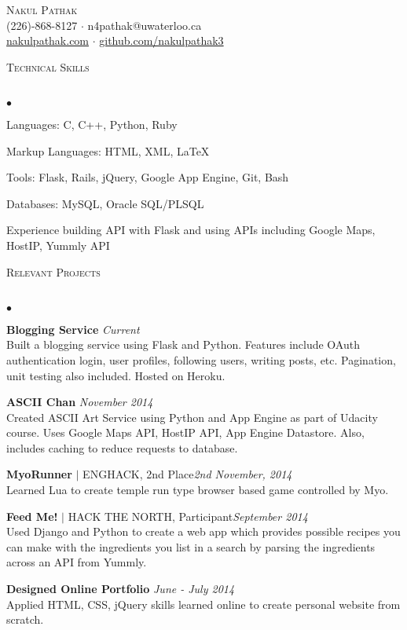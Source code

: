\documentclass{article}
\newcommand{\lineunder}{\vspace*{-8pt} \\ \hspace*{-18pt} \hrulefill \\}
\newcommand{\header}[1]{{\hspace*{-15pt}\vspace*{6pt} \textsc{#1}} \vspace*{-6pt} \lineunder}
\newenvironment{achievements}{\begin{list}{$\bullet$}{\topsep 0pt \itemsep -1.5pt \leftmargin 5pt}}{\vspace*{4pt}\end{list}}
\begin{document}
\small
\smallskip
\vspace*{-45pt}

\begin{center}
	{\huge \scshape {Nakul Pathak}} \\
\vspace*{6pt} 
(226)-868-8127 $\cdot$ n4pathak@uwaterloo.ca \\
\vspace{1.5pt}
  \url{nakulpathak.com}  $\cdot$ \url{github.com/nakulpathak3}
\end{center}


\vspace{-10pt}
\header{\normalsize Technical Skills}
\begin{achievements}
\item Languages: C, C++, Python, Ruby
\item Markup Languages: HTML, XML, LaTeX
\item Tools: Flask, Rails, jQuery, Google App Engine, Git, Bash
\item Databases: MySQL, Oracle SQL/PLSQL
\item Experience building API with Flask and using APIs including Google Maps, HostIP, Yummly API
\end{achievements}

\vspace{7pt}

\header{\normalsize Relevant Projects}
\begin{achievements}
\item \textbf{Blogging Service}  \hfill \textit {Current}
\\ Built a blogging service using Flask and Python. Features include OAuth authentication login, user profiles, following users, writing posts, etc. Pagination, unit testing also included. Hosted on Heroku.
\item \textbf{ASCII Chan} \hfill \textit {November 2014}
\\ Created ASCII Art Service using Python and App Engine as part of Udacity course. Uses Google Maps API, HostIP API, App Engine Datastore. Also, includes caching to reduce requests to database. 
\item\textbf{MyoRunner} {$|$ \scriptsize ENGHACK, 2nd Place}\hfill\textit{2nd November, 2014}
\\ Learned Lua to create temple run type browser based game controlled by Myo.
\item \textbf{Feed Me!} {$|$ \scriptsize HACK THE NORTH, Participant}\hfill \textit {September 2014}
\\ Used Django and Python to create a web app which provides possible recipes you can make with the ingredients you list in a search by parsing the ingredients across an API from Yummly.
\item \textbf{Designed Online Portfolio} \hfill \textit {June - July 2014}
\\ Applied HTML, CSS, jQuery skills learned online to create personal website from scratch.
\end{achievements}
\end{document}
